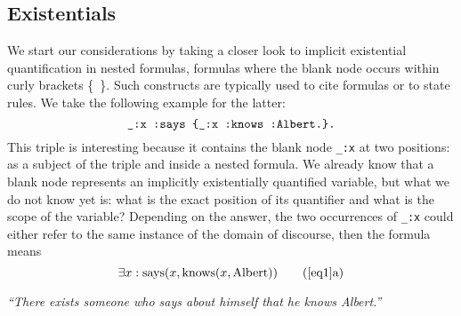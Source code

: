 \subsection{Existentials}\label{existentials}
We start our considerations by taking a closer look to implicit existential quantification in nested formulas, 
\ie formulas where the blank node occurs within curly brackets \{~\}.  Such constructs are typically used to cite formulas or
to state rules. We take the following example for the latter:
% 
\begin{equation}\label{eq1}
\verb!_:x :says {_:x :knows :Albert.}.!
 \end{equation}
This triple is interesting because it contains the blank node \texttt{\_:x} at two positions: as a subject of the triple and inside a nested formula. We already know 
that a blank node represents an implicitly existentially quantified variable, but what we do not know yet is: what is the exact position of its quantifier 
and what is the scope of the variable? Depending on the answer, the two occurrences of \texttt{\_:x} could either refer to the same instance of the domain of discourse, 
then the formula means
%
\[\exists x : \text{says}(x, \text{knows}(x, \text{Albert})) \tag{\ref{eq1}a} \label{zwei}\]
\begin{center}\textit{``There exists someone who says about himself that he knows Albert.''}
  \end{center}
